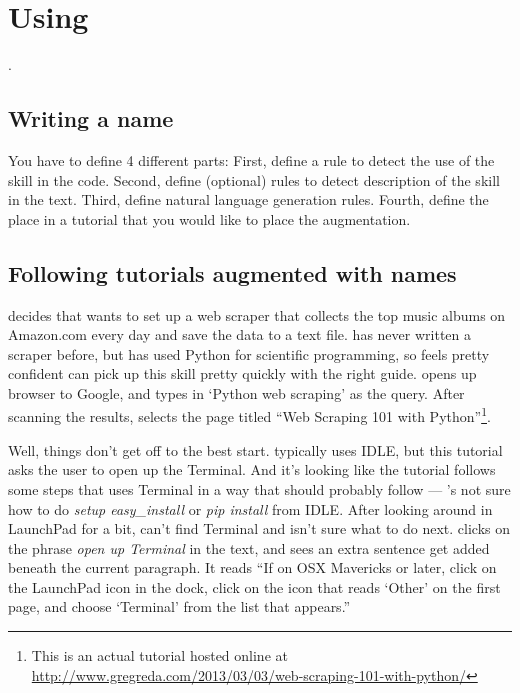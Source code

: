 \section{Using \systemname{}}

.

\subsection{Writing a \gls{name}}

You have to define 4 different parts:
First, define a rule to detect the use of the skill in the code.
Second, define (optional) rules to detect description of the skill in the text.
Third, define natural language generation rules.
Fourth, define the place in a tutorial that you would like to place the augmentation.

\subsection{Following tutorials augmented with \glspl{name}}

\user{} decides that \userpro{} wants to set up a web scraper that collects the top music albums on Amazon.com every day and save the data to a text file.
\userpro{} has never written a scraper before, but has used Python for scientific programming, so \userpro{} feels pretty confident \userpro{} can pick up this skill pretty quickly with the right guide.
\userpro{} opens up \userpos{} browser to Google, and types in `Python web scraping' as the query.
After scanning the results, \userpro{} selects the page titled ``Web Scraping 101 with Python''\footnote
{This is an actual tutorial hosted online at \url{http://www.gregreda.com/2013/03/03/web-scraping-101-with-python/}}.

Well, things don't get off to the best start.
\user{} typically uses IDLE, but this tutorial asks the user to open up the Terminal.
And it's looking like the tutorial follows some steps that uses Terminal in a way that \userpro{} should probably follow --- \userpro{}'s not sure how to do \emph{setup easy\_install} or \emph{pip install} from IDLE.
After looking around in LaunchPad for a bit, \userpro{} can't find Terminal and isn't sure what to do next.
\userpro{} clicks on the phrase \emph{open up Terminal} in the text, and sees an extra sentence get added beneath the current paragraph.
It reads ``If on OSX Mavericks or later, click on the LaunchPad icon in the dock, click on the icon that reads `Other' on the first page, and choose `Terminal' from the list that appears.''

